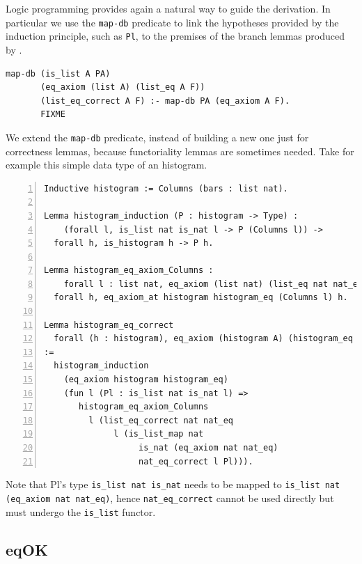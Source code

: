\documentclass[sigplan,10pt,review]{acmart}\settopmatter{printfolios=true,printccs=false,printacmref=false}
\newcommand{\derive}[1]{\keys{#1}}
\begin{document}
Logic programming provides again a natural way to guide the
derivation. In particular we use the \lstinline+map-db+ predicate
to link the hypotheses provided by the induction principle,
such as \lstinline+Pl+, to the premises of the branch lemmas
produced by \derive{eqK}. 

\begin{minipage}{\textwidth}\begin{lstlisting}[]
map-db (is_list A PA)
       (eq_axiom (list A) (list_eq A F))
       (list_eq_correct A F) :- map-db PA (eq_axiom A F).
       FIXME
\end{lstlisting}\end{minipage}

\noindent
We extend the \lstinline+map-db+ predicate, instead of building
a new one just for correctness lemmas, because functoriality lemmas
are sometimes needed. Take for example this simple data type
of an histogram.

\begin{minipage}{\textwidth}\begin{lstlisting}[numbers=left]
Inductive histogram := Columns (bars : list nat).

Lemma histogram_induction (P : histogram -> Type) :
    (forall l, is_list nat is_nat l -> P (Columns l)) ->
  forall h, is_histogram h -> P h.

Lemma histogram_eq_axiom_Columns :
    forall l : list nat, eq_axiom (list nat) (list_eq nat nat_eq) l ->
  forall h, eq_axiom_at histogram histogram_eq (Columns l) h.

Lemma histogram_eq_correct 
  forall (h : histogram), eq_axiom (histogram A) (histogram_eq A fa) h
:=
  histogram_induction 
    (eq_axiom histogram histogram_eq)
    (fun l (Pl : is_list nat is_nat l) =>
       histogram_eq_axiom_Columns
         l (list_eq_correct nat nat_eq
              l (is_list_map nat
                   is_nat (eq_axiom nat nat_eq)
                   nat_eq_correct l Pl))).
\end{lstlisting}\end{minipage}

\noindent
Note that Pl's type \lstinline+is_list nat is_nat+
needs to be mapped to \lstinline+is_list nat (eq_axiom nat nat_eq)+,
hence \lstinline+nat_eq_correct+ cannot be used directly
but must undergo the \lstinline+is_list+ functor.

\subsection{eqOK} %
\end{document}
